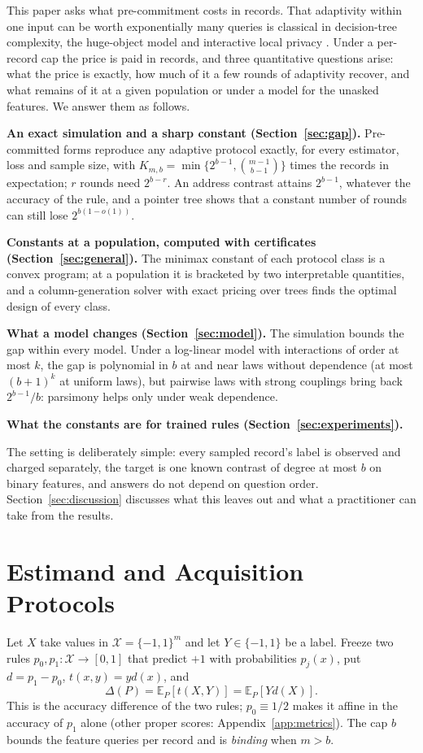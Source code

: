 \documentclass{article}
\newcommand{\E}{\mathbb{E}}
\newcommand{\X}{\mathcal X}
\begin{document}
This paper asks what pre-commitment costs in records. That adaptivity within one input can be worth exponentially many queries is classical in decision-tree complexity, the huge-object model and interactive local privacy \citep{goldreich2022,adar2024,joseph2019}. Under a per-record cap the price is paid in records, and three quantitative questions arise: what the price is exactly, how much of it a few rounds of adaptivity recover, and what remains of it at a given population or under a model for the unasked features. We answer them as follows.

\textbf{An exact simulation and a sharp constant (Section~\ref{sec:gap}).} Pre-committed forms reproduce any adaptive protocol exactly, for every estimator, loss and sample size, with $K_{m,b}=\min\{2^{b-1},\binom{m-1}{b-1}\}$ times the records in expectation; $r$ rounds need $2^{b-r}$. An address contrast attains $2^{b-1}$, whatever the accuracy of the rule, and a pointer tree shows that a constant number of rounds can still lose $2^{b(1-o(1))}$.

\textbf{Constants at a population, computed with certificates (Section~\ref{sec:general}).} The minimax constant of each protocol class is a convex program; at a population it is bracketed by two interpretable quantities, and a column-generation solver with exact pricing over trees finds the optimal design of every class.

\textbf{What a model changes (Section~\ref{sec:model}).} The simulation bounds the gap within every model. Under a log-linear model with interactions of order at most $k$, the gap is polynomial in $b$ at and near laws without dependence (at most $(b+1)^k$ at uniform laws), but pairwise laws with strong couplings bring back $2^{b-1}/b$: parsimony helps only under weak dependence.

\textbf{What the constants are for trained rules (Section~\ref{sec:experiments}).} \nContribData

The setting is deliberately simple: every sampled record's label is observed and charged separately, the target is one known contrast of degree at most $b$ on binary features, and answers do not depend on question order. Section~\ref{sec:discussion} discusses what this leaves out and what a practitioner can take from the results.

\section{Estimand and Acquisition Protocols}\label{sec:setup}
Let $X$ take values in $\X=\{-1,1\}^m$ and let $Y\in\{-1,1\}$ be a label. Freeze two rules $p_0,p_1:\X\to[0,1]$ that predict $+1$ with probabilities $p_j(x)$, put $d=p_1-p_0$, $t(x,y)=yd(x)$, and
\begin{equation}
 \Delta(P)=\E_P[t(X,Y)]=\E_P[Yd(X)].\label{eq:gain}
\end{equation}
This is the accuracy difference of the two rules; $p_0\equiv1/2$ makes it affine in the accuracy of $p_1$ alone (other proper scores: Appendix~\ref{app:metrics}). The cap $b$ bounds the feature queries per record and is \emph{binding} when $m>b$.
\end{document}
